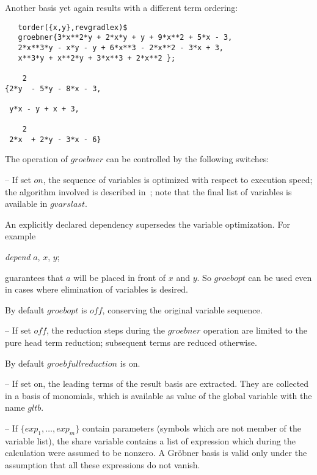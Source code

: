 Another basis yet again results with a different term ordering:
\begin{verbatim}
   torder({x,y},revgradlex)$
   groebner{3*x**2*y + 2*x*y + y + 9*x**2 + 5*x - 3,
   2*x**3*y - x*y - y + 6*x**3 - 2*x**2 - 3*x + 3,
   x**3*y + x**2*y + 3*x**3 + 2*x**2 };

    2
{2*y  - 5*y - 8*x - 3,

 y*x - y + x + 3,

    2
 2*x  + 2*y - 3*x - 6}

\end{verbatim}


The operation of $groebner$ can be controlled by the following switches:
\begin{description}
\item[groebopt] -- If set $on$, the sequence of variables is optimized
with respect to execution speed; the algorithm involved is described
in~\cite{Boege:86}; note that the final list of variables is available in
$gvarslast$.

An explicitly declared dependency supersedes the variable optimization. For example
\begin{center}
{\it depend} $a$, $x$, $y$;
\end{center}
guarantees that $a$ will be placed in front of $x$ and $y$. So
$groebopt$ can be used even in cases where elimination of variables is desired.

By default $groebopt$ is $off$, conserving the original variable sequence.

\item[$groebfullreduction$] -- If set $off$, the reduction steps during
the \linebreak[4] $groebner$ operation are limited to the pure head
term reduction; subsequent terms are reduced otherwise.

By default $groebfullreduction$ is on.

\item[$gltbasis$] -- If set on, the leading terms of the result basis are
extracted. They are collected in a basis of monomials, which is
available as value of the global variable with the name $gltb$.

\item[$glterms$] -- If $\{exp_1, \ldots , exp_m\} $ contain parameters
(symbols which are not member of the variable list), the share variable
 contains a list of expression which during the
calculation were assumed to be nonzero. A Gr\"obner basis
is valid only under the assumption that all these expressions do not vanish.

\end{description}

